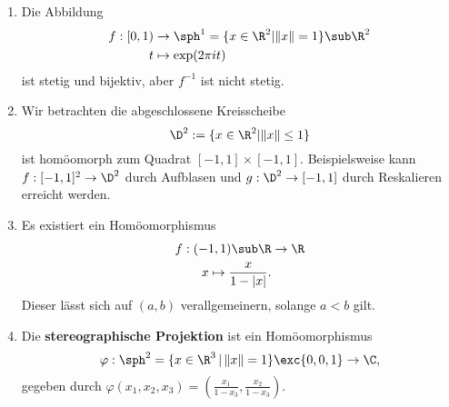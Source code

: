 \begin{beispiele}
\begin{enumerate}
\item Die Abbildung
\begin{align}
f: [0,1) &\to \sph^1 = \{x \in \R^2 | \| x\| = 1 \} \sub \R^2\\
t &\mapsto \exp(2 \pi it)
\end{align}
ist stetig und bijektiv, aber $f^{-1}$ ist nicht stetig.
\item Wir betrachten die abgeschlossene Kreisscheibe
\begin{equation}
\D^2 := \{x \in \R^2 | \|x\| \leq 1\}
\end{equation}
ist homöomorph zum Quadrat $[-1,1] \times [-1,1]$. Beispielsweise kann $f: [-1,1]^2 \to \D^2$ durch Aufblasen und $g: \D^2 \to [-1,1]$ durch Reskalieren erreicht werden.
\item Es existiert ein Homöomorphismus 
\begin{align}
f: (-1,1) \sub \R &\to \R\\
x \mapsto \frac{x}{1-|x|}.
\end{align}
Dieser lässt sich auf $(a,b)$ verallgemeinern, solange $a<b$ gilt.
\item Die \textbf{stereographische Projektion} ist ein Homöomorphismus
\begin{equation}
\varphi: \sph^2 = \{x \in \R^3 \, | \, \| x\|=1 \} \exc \{0,0,1\} \to \C,
\end{equation}
gegeben durch $\varphi(x_1,x_2,x_3) = \left( \frac{x_1}{1-x_3}, \frac{x_2}{1-x_3}\right)$.
\end{enumerate}
\end{beispiele}